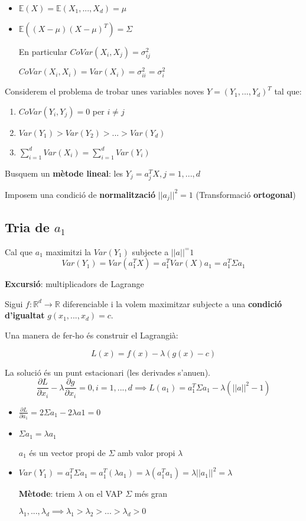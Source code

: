 \documentclass[a4paper]{article}
\begin{document}
	\begin{itemize}
		\item $\mathbb{E}(X) = \mathbb{E}(X_1, ..., X_d) = \mu$
		\item $\mathbb{E}((X - \mu)(X-\mu)^T) = \Sigma$
		
		En particular $CoVar(X_i, X_j) = \sigma_{ij}^2$
		
		$CoVar(X_i, X_i) = Var(X_i) = \sigma_{ii}^2=\sigma_i^2$
	\end{itemize}
	
	Considerem el problema de trobar unes variables noves $Y = (Y_1, ..., Y_d)^T$ tal que:
	
	\begin{enumerate}
		\item $CoVar(Y_i, Y_j) = 0$ per $i \ne j$
		\item $Var(Y_1) > Var(Y_2) > ... > Var(Y_d)$
		\item $\sum_{i=1}^d Var(X_i) = \sum_{i=1}^d Var(Y_i)$
	\end{enumerate}
	
	Busquem un \textbf{mètode lineal}: les $Y_j = a_j^TX, j=1,...,d$
	
	Imposem una condició de \textbf{normalització} $||a_j||^2 = 1$ 
	(Transformació \textbf{ortogonal})
	
	\subsection{Tria de $a_1$}
	Cal que $a_1$ maximitzi la $Var(Y_1)$ subjecte a $||a||^=1$
	\[Var(Y_1) = Var(a_1^TX) = a_1^TVar(X)a_1 = a_1^T\Sigma a_1\]
	
	\textbf{Excursió}: multiplicadors de Lagrange
	
	Sigui $f:\mathbb{R}^d \rightarrow \mathbb{R}$ diferenciable i la volem maximitzar subjecte a una \textbf{condició d'igualtat} $g(x_1, ..., x_d) = c$.
	
	Una manera de fer-ho és construir el Lagrangià:
	
	\[ L(x) = f(x) - \lambda(g(x) - c) \]
	
	La solució és un punt estacionari (les derivades s'anu\lgem en).
	\[ \frac{\partial L}{\partial x_i} - \lambda \frac{\partial g}{\partial x_i} = 0, i = 1, ..., d \implies L(a_1) = a_1^T\Sigma a_1 - \lambda(||a||^2 - 1) \]
	
	\begin{itemize}
		\item $\frac{\partial L}{\partial a_1} = 2\Sigma a_1 - 2\lambda a1 = 0$
		\item $\Sigma a_1 = \lambda a_1$
		
		$a_1$ és un vector propi de $\Sigma$ amb valor propi $\lambda$
		\item $Var(Y_1) = a_1^T\Sigma a_1=a_1^T(\lambda a_1) = \lambda(a_1^T a_1) = \lambda ||a_1||^2 = \lambda$
		
		\textbf{Mètode}: triem $\lambda$ on el VAP $\Sigma$ més gran
		
		$\lambda_1, ..., \lambda_d \implies \lambda_1 > \lambda_2 > ... > \lambda_d > 0$
	\end{itemize}
	
\end{document}
